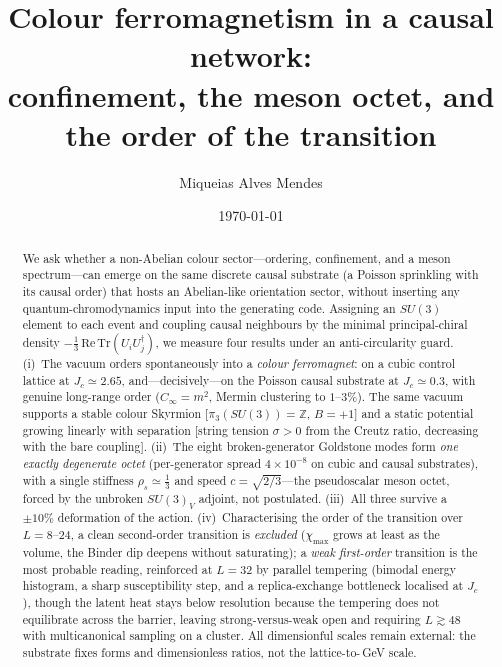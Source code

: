\documentclass[aps,prd,reprint,nofootinbib,superscriptaddress,floatfix]{revtex4-2}
\begin{document}
\title{Colour ferromagnetism in a causal network:\\
confinement, the meson octet, and the order of the transition}

\author{Miqueias Alves Mendes}
\date{\today}

\begin{abstract}
We ask whether a non-Abelian colour sector---ordering, confinement, and a meson
spectrum---can emerge on the same discrete causal substrate (a Poisson sprinkling with
its causal order) that hosts an Abelian-like orientation sector, without inserting any
quantum-chromodynamics input into the generating code. Assigning an $SU(3)$ element to
each event and coupling causal neighbours by the minimal principal-chiral density
$-\tfrac13\,\mathrm{Re}\,\mathrm{Tr}(U_iU_j^\dagger)$, we measure four results under an
anti-circularity guard. (i)~The vacuum orders spontaneously into a \emph{colour
ferromagnet}: on a cubic control lattice at $J_c\simeq2.65$, and---decisively---on the
Poisson causal substrate at $J_c\simeq0.3$, with genuine long-range order
($C_\infty=m^2$, Mermin clustering to $1$--$3\%$). The same vacuum supports a stable
colour Skyrmion [$\pi_3(SU(3))=\mathbb{Z}$, $B=+1$] and a static potential growing
linearly with separation [string tension $\sigma>0$ from the Creutz ratio, decreasing
with the bare coupling]. (ii)~The eight broken-generator Goldstone modes form
\emph{one exactly degenerate octet} (per-generator spread $4\times10^{-8}$ on cubic and
causal substrates), with a single stiffness $\rho_s\simeq\tfrac13$ and speed
$c=\sqrt{2/3}$---the pseudoscalar meson octet, forced by the unbroken $SU(3)_V$ adjoint,
not postulated. (iii)~All three survive a $\pm10\%$ deformation of the action.
(iv)~Characterising the order of the transition over $L=8$--$24$, a clean second-order
transition is \emph{excluded} ($\chi_{\max}$ grows at least as the volume, the Binder
dip deepens without saturating); a \emph{weak first-order} transition is the most
probable reading, reinforced at $L=32$ by parallel tempering (bimodal energy histogram,
a sharp susceptibility step, and a replica-exchange bottleneck localised at $J_c$), though
the latent heat stays below resolution because the tempering does not equilibrate across
the barrier, leaving strong-versus-weak open and requiring $L\gtrsim48$ with multicanonical
sampling on a cluster. All
dimensionful scales remain external: the substrate fixes forms and dimensionless ratios,
not the lattice-to-\,GeV scale.
\end{abstract}
\end{document}
